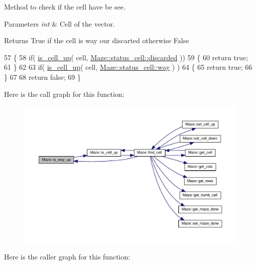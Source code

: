 Method to check if the cell have be see. 


\begin{DoxyParams}{Parameters}
{\em int} & Cell of the vector. \\
\hline
\end{DoxyParams}
\begin{DoxyReturn}{Returns}
True if the cell is way our discarted otherwise False 
\end{DoxyReturn}

\begin{DoxyCode}
57 \{
58     \textcolor{keywordflow}{if}( \hyperlink{classMaze_a2b0e69e72d6c3e1037578f057946a21e}{is\_cell\_up}( cell, \hyperlink{classMaze_a07167e321eac2b67100fb82ecb98f1d1a94708897ec9db8647dfe695714c98e46}{Maze::status\_cell::discarded} ))
59     \{
60         \textcolor{keywordflow}{return} \textcolor{keyword}{true};
61     \}
62 
63     \textcolor{keywordflow}{if}( \hyperlink{classMaze_a2b0e69e72d6c3e1037578f057946a21e}{is\_cell\_up}( cell, \hyperlink{classMaze_a07167e321eac2b67100fb82ecb98f1d1ac83b72dd001482ce10f0b106c7a0ed0e}{Maze::status\_cell::way} ) )
64     \{
65         \textcolor{keywordflow}{return} \textcolor{keyword}{true};
66     \}
67 
68     \textcolor{keywordflow}{return} \textcolor{keyword}{false};
69 \}
\end{DoxyCode}
Here is the call graph for this function\+:\nopagebreak
\begin{figure}[H]
\begin{center}
\leavevmode
\includegraphics[width=350pt]{classMaze_a308fa695665de6217c0e7f28aab5adda_cgraph}
\end{center}
\end{figure}
Here is the caller graph for this function\+:\nopagebreak
